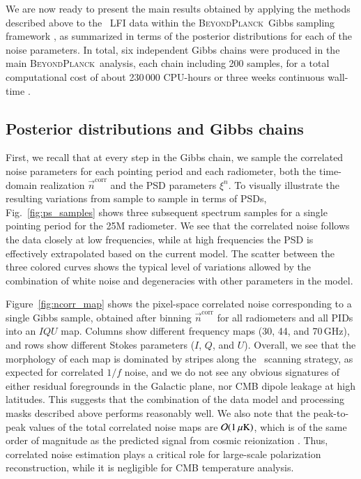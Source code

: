 \documentclass[twocolumn]{aa}
\newcommand{\n}[0]{\vec{n}}
\newcommand{\BP}{\textsc{BeyondPlanck}}
\begin{document}
We are now ready to present the main results obtained by applying the
methods described above to the \Planck\ LFI data within the \BP\ Gibbs
sampling framework \citep{bp01}, as summarized in terms of the
posterior distributions for each of the noise parameters. In total,
six independent Gibbs chains were produced in the main \BP\ analysis,
each chain including 200 samples, for a total computational cost of
about 230\,000 CPU-hours or three weeks continuous wall-time
\citep{bp01,bp05}.

\subsection{Posterior distributions and Gibbs chains}

First, we recall that at every step in the Gibbs chain, we sample the
correlated noise parameters for each pointing period and each
radiometer, both the time-domain realization $\n^{\mathrm{corr}}$ and
the PSD parameters $\xi^n$. To visually illustrate the resulting
variations from sample to sample in terms of PSDs,
Fig.~\ref{fig:ps_samples} shows three subsequent spectrum samples for
a single pointing period for the 25M radiometer. We see that the
correlated noise follows the data closely at low frequencies, while at
high frequencies the PSD is effectively extrapolated based on the current
model. The scatter between the three colored curves shows the typical
level of variations allowed by the combination of white noise and
degeneracies with other parameters in the model.

Figure~\ref{fig:ncorr_map} shows the pixel-space correlated noise 
corresponding to a single Gibbs sample, obtained
after binning $\n^{\mathrm{corr}}$ for all radiometers and all PIDs
into an $IQU$ map. Columns show different frequency maps (30, 44, and
70\,GHz), and rows show different Stokes parameters ($I$, $Q$, and
$U$). Overall, we see that the morphology of each map is dominated by
stripes along the \Planck\ scanning strategy, as expected for
correlated $1/f$ noise, and we do not see any obvious signatures of
either residual foregrounds in the Galactic plane, nor CMB dipole
leakage at high latitudes. This suggests that the combination of the
data model and processing masks described above performs reasonably
well. We also note that the peak-to-peak values of the total
correlated noise maps are $\mathcal{O}(1\muK)$, which is of the same
order of magnitude as the predicted signal from cosmic reionization
\citep{planck2016-l04}. Thus, correlated noise estimation plays a
critical role for large-scale polarization reconstruction, while it is
negligible for CMB temperature analysis.
\end{document}
